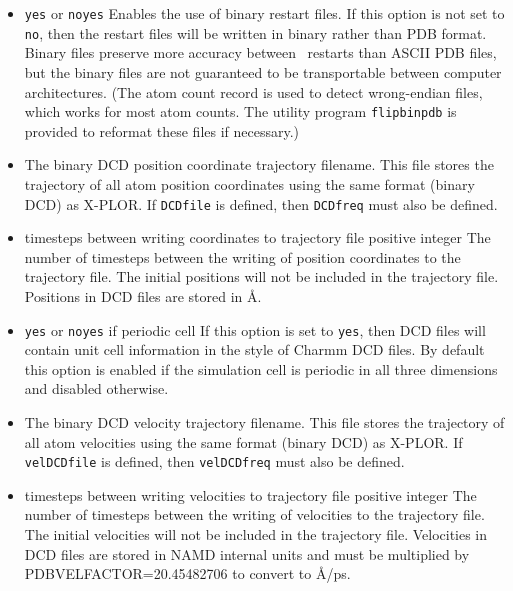 \begin{itemize}
\item
{}
{{\tt yes} or {\tt no}}{{\tt yes}}
{
Enables the use of binary restart files.  
If this option is not set to {\tt no}, then the restart files 
will be written in binary rather than PDB format.  
Binary files preserve more accuracy between \NAMD\ restarts 
than ASCII PDB files, 
but the binary files are not guaranteed to be transportable 
between computer architectures. (The atom count record is used
to detect wrong-endian files, which works for most atom counts.
The utility program {\tt flipbinpdb} is provided
to reformat these files if necessary.)
}

\item
{}
{
The binary DCD position coordinate trajectory filename.  
This file stores the trajectory of all atom position coordinates 
using the same format (binary DCD) as X-PLOR.  
If {\tt DCDfile} is defined, then {\tt DCDfreq} must also be defined.  
}

\item
{}
{timesteps between writing coordinates to trajectory file}
{positive integer}
{
The number of timesteps between the writing of position coordinates 
to the trajectory file.  
The initial positions will not be included in the trajectory file.
Positions in DCD files are stored in \AA.
}

\item
{}
{{\tt yes} or {\tt no}}{{\tt yes} if periodic cell}
{
If this option is set to {\tt yes}, then DCD files will contain unit
cell information in the style of Charmm DCD files.
By default this option is enabled if the simulation cell is periodic
in all three dimensions and disabled otherwise.
}

\item
{}
{
The binary DCD velocity trajectory filename.  
This file stores the trajectory of 
all atom velocities using the same format (binary DCD) as X-PLOR.  
If {\tt velDCDfile} is defined, then {\tt velDCDfreq} must also 
be defined.  
}

\item
{}
{timesteps between writing velocities to trajectory file}
{positive integer}
{
The number of timesteps between the writing of 
velocities to the trajectory file.  
The initial velocities will not be included in the trajectory file.
Velocities in DCD files are stored in NAMD internal
units and must be multiplied by PDBVELFACTOR=20.45482706
to convert to \AA/ps.
}


\end{itemize}
